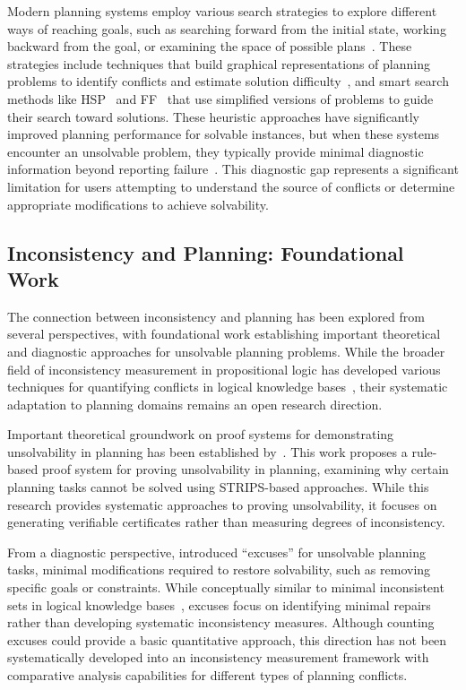 \documentclass[proposal,english,palatino]{AIGpaper}
\begin{document}
Modern planning systems employ various search strategies to explore different ways of reaching goals, such as searching forward from the initial state, working backward from the goal, or examining the space of possible plans~\cite{Ghallab2004,Russell2016}. These strategies include techniques that build graphical representations of planning problems to identify conflicts and estimate solution difficulty~\cite{Blum1997}, and smart search methods like \ac{HSP}~\cite{Bonet2001} and \ac{FF}~\cite{Hoffmann2001} that use simplified versions of problems to guide their search toward solutions. These heuristic approaches have significantly improved planning performance for solvable instances, but when these systems encounter an unsolvable problem, they typically provide minimal diagnostic information beyond reporting failure~\cite{Eriksson2018}. This diagnostic gap represents a significant limitation for users attempting to understand the source of conflicts or determine appropriate modifications to achieve solvability.

\subsection{Inconsistency and Planning: Foundational Work}

The connection between inconsistency and planning has been explored from several perspectives, with foundational work establishing important theoretical and diagnostic approaches for unsolvable planning problems. While the broader field of inconsistency measurement in propositional logic has developed various techniques for quantifying conflicts in logical knowledge bases~\cite{Thimm2019,Grant2023}, their systematic adaptation to planning domains remains an open research direction.

Important theoretical groundwork on proof systems for demonstrating unsolvability in planning has been established by~\cite{Eriksson2018}. This work proposes a rule-based proof system for proving unsolvability in planning, examining why certain planning tasks cannot be solved using \ac{STRIPS}-based approaches. While this research provides systematic approaches to proving unsolvability, it focuses on generating verifiable certificates rather than measuring degrees of inconsistency.

From a diagnostic perspective, \cite{Goebelbecker2010} introduced ``excuses'' for unsolvable planning tasks, minimal modifications required to restore solvability, such as removing specific goals or constraints. While conceptually similar to minimal inconsistent sets in logical knowledge bases~\cite{Hunter2008}, excuses focus on identifying minimal repairs rather than developing systematic inconsistency measures. Although counting excuses could provide a basic quantitative approach, this direction has not been systematically developed into an inconsistency measurement framework with comparative analysis capabilities for different types of planning conflicts.
\end{document}
